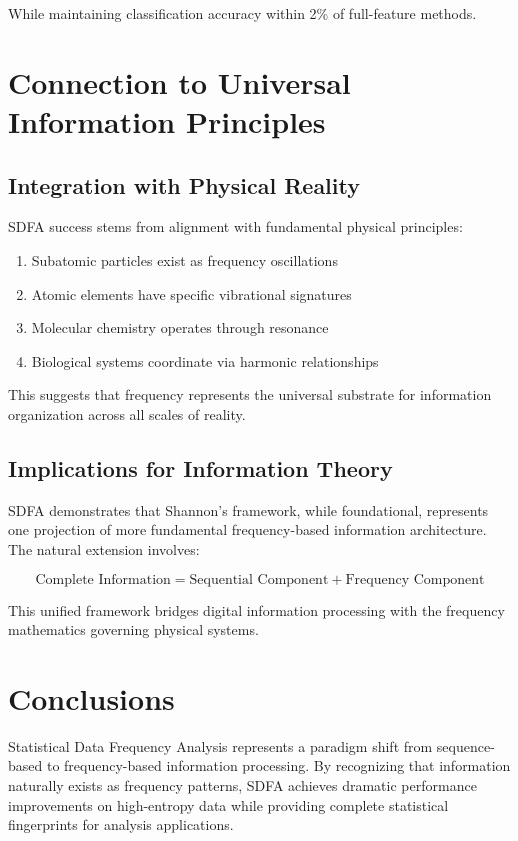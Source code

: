 \documentclass[journal]{IEEEtran}
\newcommand{\sdfa}{\textsc{SDFA}}
\begin{document}
While maintaining classification accuracy within 2\% of full-feature methods.

\section{Connection to Universal Information Principles}

\subsection{Integration with Physical Reality}

\sdfa{} success stems from alignment with fundamental physical principles:
\begin{enumerate}
    \item Subatomic particles exist as frequency oscillations
    \item Atomic elements have specific vibrational signatures  
    \item Molecular chemistry operates through resonance
    \item Biological systems coordinate via harmonic relationships
\end{enumerate}

This suggests that frequency represents the universal substrate for information organization across all scales of reality.

\subsection{Implications for Information Theory}

\sdfa{} demonstrates that Shannon's framework, while foundational, represents one projection of more fundamental frequency-based information architecture. The natural extension involves:

\begin{equation}
\text{Complete Information} = \text{Sequential Component} + \text{Frequency Component}
\end{equation}

This unified framework bridges digital information processing with the frequency mathematics governing physical systems.

\section{Conclusions}

Statistical Data Frequency Analysis represents a paradigm shift from sequence-based to frequency-based information processing. By recognizing that information naturally exists as frequency patterns, \sdfa{} achieves dramatic performance improvements on high-entropy data while providing complete statistical fingerprints for analysis applications.
\end{document}
